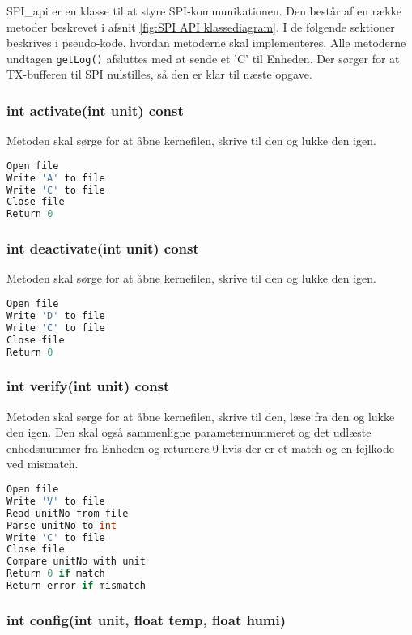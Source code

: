 
SPI\_api er en klasse til at styre SPI-kommunikationen. Den består af en række metoder beskrevet i afsnit \ref{fig:SPI API klassediagram}. I de følgende sektioner beskrives i pseudo-kode, hvordan metoderne skal implementeres. Alle metoderne undtagen \verb+getLog()+ afsluttes med at sende et 'C' til Enheden. Der sørger for at TX-bufferen til SPI nulstilles, så den er klar til næste opgave.

\subsubsection*{int activate(int unit) const}

Metoden skal sørge for at åbne kernefilen, skrive til den og lukke den igen.

\begin{lstlisting}[language=C]
Open file
Write 'A' to file
Write 'C' to file
Close file
Return 0
\end{lstlisting} 
\subsubsection*{int deactivate(int unit) const}

Metoden skal sørge for at åbne kernefilen, skrive til den og lukke den igen.

\begin{lstlisting}[language=C]
Open file
Write 'D' to file
Write 'C' to file
Close file
Return 0
\end{lstlisting} 
\subsubsection*{int verify(int unit) const} 

Metoden skal sørge for at åbne kernefilen, skrive til den, læse fra den og lukke den igen.
Den skal også sammenligne parameternummeret og det udlæste enhedsnummer fra Enheden og returnere 0 hvis der er et match og en fejlkode ved mismatch.

\begin{lstlisting}[language=C]
Open file
Write 'V' to file
Read unitNo from file
Parse unitNo to int
Write 'C' to file
Close file
Compare unitNo with unit
Return 0 if match
Return error if mismatch
\end{lstlisting} 
\subsubsection*{int config(int unit, float temp, float humi)} 

